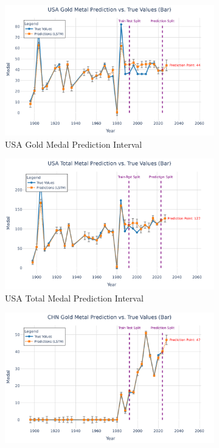 \documentclass{mcmthesis}
\begin{document}
\begin{figure}[H]
	\centering
	\begin{subfigure}[b]{0.48\textwidth}
		\includegraphics[width=\textwidth]{fig/USA Gold Metal Prediction vs. True Values (Bar).png}
		\caption{USA Gold Medal Prediction Interval}
		\label{fig:usa_gold}
	\end{subfigure}
	\hfill
	\begin{subfigure}[b]{0.48\textwidth}
		\includegraphics[width=\textwidth]{fig/USA Total Metal Prediction vs. True Values (Bar).png}
		\caption{USA Total Medal Prediction Interval}
		\label{fig:usa_total}
	\end{subfigure}
	\caption{Medal Range Projections for China and USA in 2028}
	\label{fig:chn_usa_pred}
		\begin{subfigure}[b]{0.48\textwidth}
		\includegraphics[width=\textwidth]{fig/CHN Gold Metal Prediction vs. True Values (Bar).png}

\end{subfigure}
\end{figure}
\end{document}
